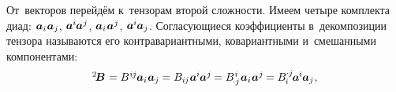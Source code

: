 \begin{otherlanguage}{russian}

От~векторов перейдём к~тензорам второй сложности.
Имеем четыре комплекта диад:
${\bm{a}_i \hspace{.1ex} \bm{a}_j}$,
\hbox{$\bm{a}^{\hspace{-0.05ex}i} \hspace{-0.1ex} \bm{a}^{\hspace{0.05ex}j}$\hspace{-0.25ex},}
\hbox{$\bm{a}_i \hspace{.1ex} \bm{a}^{\hspace{0.05ex}j}$\hspace{-0.25ex},}
${\bm{a}^{\hspace{-0.05ex}i} \hspace{-0.1ex} \bm{a}_j}$.
Согласующиеся коэффициенты в~декомпозиции тензора называются его контра\-вариант\-ными, ко\-вариант\-ными и~смешан\-ными компонентами:
\vspace{.1em}\begin{equation}\begin{array}{c}
{^2\!\bm{B}} \hspace{.1ex} =
B^{\hspace{.1ex}{i\hspace{-0.1ex}j}} \hspace{-0.1ex} \bm{a}_i \hspace{.1ex} \bm{a}_j \hspace{-0.05ex} =
B_{i\hspace{-0.1ex}j} \hspace{.1ex} \bm{a}^{\hspace{-0.05ex}i} \hspace{-0.1ex} \bm{a}^{\hspace{0.05ex}j} \hspace{-0.15ex} =
B_{\hspace{-0.2ex} \cdot j}^{\hspace{.1ex}i} \hspace{.1ex} \bm{a}_i \hspace{.1ex} \bm{a}^{\hspace{0.05ex}j} \hspace{-0.15ex} =
B_{\hspace{-0.1ex}i}^{\hspace{-0.05ex} \cdot j} \hspace{-0.2ex} \bm{a}^{\hspace{-0.05ex}i} \hspace{-0.1ex} \bm{a}_j \hspace{.1ex}, \\[0.4em]

\end{array}
\end{equation}
\end{otherlanguage}
